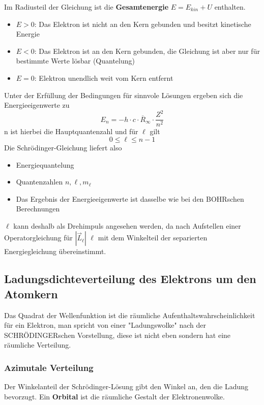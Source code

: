 \documentclass[12pt,a4paper,ngerman]{article}
\begin{document}
Im Radiusteil der Gleichung ist die \textbf{Gesamtenergie} $E = E_{kin} + U$ enthalten. 
\begin{itemize}
\item $E  >  0$: Das Elektron ist nicht an den Kern gebunden und besitzt kinetische Energie
\item $E  <  0$: Das Elektron ist an den Kern gebunden, die Gleichung ist aber nur für bestimmte Werte lösbar (Quantelung)
\item $E  =  0$: Elektron unendlich weit vom Kern entfernt
\end{itemize}
Unter der Erfüllung der Bedingungen für sinnvole Lösungen ergeben sich die Energieeigenwerte zu
\begin{equation}
E_n = -h \cdot c \cdot \overline{R}_\infty \cdot \frac{Z^2}{n^2}
\end{equation}
n ist hierbei die Hauptquantenzahl und für $\ell$ gilt
\begin{equation}
0 \leq \ell \leq n-1
\end{equation}
Die Schrödinger-Gleichung liefert also
\begin{itemize}
\item Energiequantelung
\item Quantenzahlen $n,\ell,m_\ell$
\item Das Ergebnis der Energieeigenwerte ist dasselbe wie bei den BOHRschen Berechnungen
\end{itemize}
$\ell$ kann deshalb als Drehimpuls angesehen werden, da nach Aufstellen einer Operatorgleichung für $|\vec{L}_\ell|$ $\ell$ mit dem Winkelteil der separierten Energiegleichung übereinstimmt. 


\subsection{Ladungsdichteverteilung des Elektrons um den Atomkern}

Das Quadrat der Wellenfunktion ist die räumliche Aufenthaltswahrscheinlichkeit für ein Elektron, man spricht von einer "Ladungswolke" nach der SCHRÖDINGERschen Vorstellung, diese ist nicht eben sondern hat eine räumliche Verteilung.  

\subsubsection*{Azimutale Verteilung}
Der Winkelanteil der Schrödinger-Lösung gibt den Winkel an, den die Ladung bevorzugt. Ein \textbf{Orbital} ist die räumliche Gestalt der Elektronenwolke.
\end{document}
